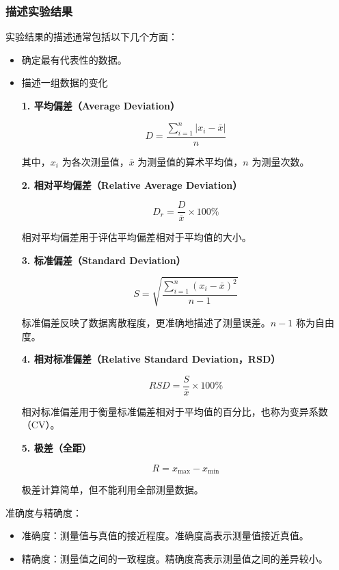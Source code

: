 \documentclass[12pt,a4paper]{article}
\numberwithin{equation}{section}
\begin{document}
\subsubsection{描述实验结果}
实验结果的描述通常包括以下几个方面：
\begin{itemize}
\item 确定最有代表性的数据。
\item 描述一组数据的变化

\textbf{1. 平均偏差（Average Deviation）}

\begin{equation}D = \frac{\sum_{i=1}^{n}|x_i - \bar{x}|}{n}\end{equation}

其中，$x_i$ 为各次测量值，$\bar{x}$ 为测量值的算术平均值，$n$ 为测量次数。

\textbf{2. 相对平均偏差（Relative Average Deviation）}

\begin{equation}D_r = \frac{D}{\bar{x}} \times 100\%\end{equation}

相对平均偏差用于评估平均偏差相对于平均值的大小。

\textbf{3. 标准偏差（Standard Deviation）}

\begin{equation}S = \sqrt{\frac{\sum_{i=1}^{n}(x_i - \bar{x})^2}{n-1}}\end{equation}

标准偏差反映了数据离散程度，更准确地描述了测量误差。$n-1$ 称为自由度。

\textbf{4. 相对标准偏差（Relative Standard Deviation，RSD）}

\begin{equation}RSD= \frac{S}{\bar{x}} \times 100\%\end{equation}

相对标准偏差用于衡量标准偏差相对于平均值的百分比，也称为变异系数（CV）。

\textbf{5. 极差（全距）}

\begin{equation}R=x_{\max}-x_{\min}\end{equation}

极差计算简单，但不能利用全部测量数据。
\end{itemize}
准确度与精确度：
\begin{itemize}
\item 准确度：测量值与真值的接近程度。准确度高表示测量值接近真值。
\item 精确度：测量值之间的一致程度。精确度高表示测量值之间的差异较小。
\end{itemize}
\end{document}
